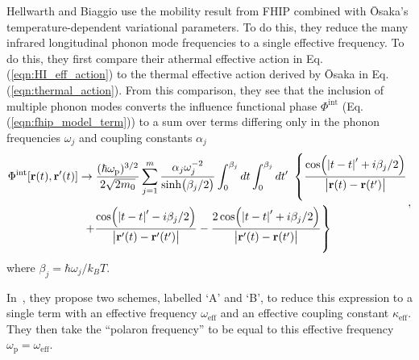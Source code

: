 Hellwarth and Biaggio use the mobility result from FHIP combined with \=Osaka's temperature-dependent variational parameters. To do this, they reduce the many infrared longitudinal phonon mode frequencies to a single effective frequency. To do this, they first compare their athermal effective action in Eq. (\ref{eqn:HI_eff_action}) to the thermal effective action derived by \=Osaka in Eq. (\ref{eqn:thermal_action}). From this comparison, they see that the inclusion of multiple phonon modes converts the influence functional phase $\Phi^{\text{int}}$ (Eq. (\ref{eqn:fhip_model_term})) to a sum over terms differing only in the phonon frequencies $\omega_j$ and coupling constants $\alpha_j$
\begin{equation} \label{eqn:hellwarth_multi_action}
    \begin{gathered}
    \Phi^{\text{int}}[\vb{r}(t), \vb{r}'(t)] \rightarrow \frac{(\hbar\omega_{\text{p}})^{3/2}}{2\sqrt{2m_0}} \sum_{j=1}^m \frac{\alpha_j \omega_j^{-2}}{\sinh(\beta_j / 2)} \int^{\beta_j}_0 dt \int^{\beta_j}_0 dt'\ \left\{ \frac{\cos(\abs{t - t}' + i\beta_j / 2)}{\abs{\vb{r}(t) - \vb{r}(t')}} \right. \\
    \left. + \frac{\cos(\abs{t - t}' - i\beta_j / 2)}{\abs{\vb{r}'(t) - \vb{r}'(t')}} - \frac{2\cos(\abs{t - t}' + i\beta_j / 2)}{\abs{\vb{r}'(t) - \vb{r}(t')}} \right\}
    \end{gathered},
\end{equation}
where $\beta_j = \hbar\omega_j / k_B T$. 

In~\cite{hellwarth_mobility_1999}, they propose two schemes, labelled `A' and `B', to reduce this expression to a single term with an effective frequency $\omega_{\text{eff}}$ and an effective coupling constant $\kappa_{\text{eff}}$. They then take the ``polaron frequency'' to be equal to this effective frequency $\omega_{\text{p}} = \omega_{\text{eff}}$. 

